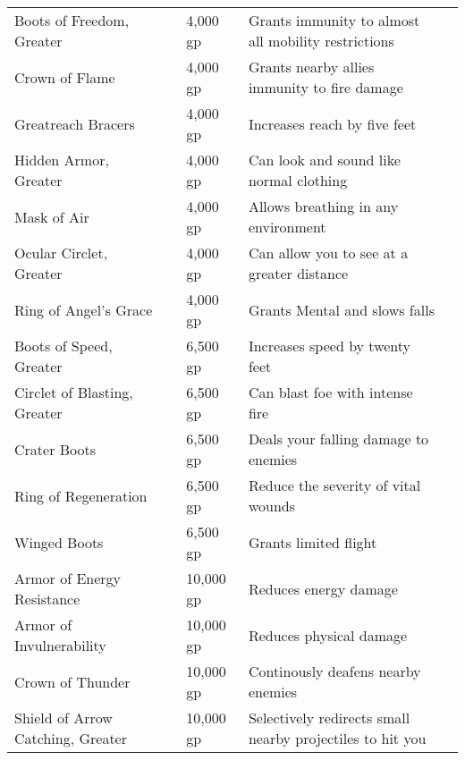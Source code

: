 \begin{longtabuwrapper}
\begin{longtabu}{l l l X l}
Boots of Freedom, Greater &  & 4,000 gp & Grants immunity to almost all mobility restrictions & \pageref{item:Boots of Freedom, Greater} \\
Crown of Flame &  & 4,000 gp & Grants nearby allies immunity to fire damage & \pageref{item:Crown of Flame} \\
Greatreach Bracers &  & 4,000 gp & Increases reach by five feet & \pageref{item:Greatreach Bracers} \\
Hidden Armor, Greater &  & 4,000 gp & Can look and sound like normal clothing & \pageref{item:Hidden Armor, Greater} \\
Mask of Air &  & 4,000 gp & Allows breathing in any environment & \pageref{item:Mask of Air} \\
Ocular Circlet, Greater &  & 4,000 gp & Can allow you to see at a greater distance & \pageref{item:Ocular Circlet, Greater} \\
Ring of Angel's Grace &  & 4,000 gp & Grants  Mental and slows falls & \pageref{item:Ring of Angel's Grace} \\
Boots of Speed, Greater &  & 6,500 gp & Increases speed by twenty feet & \pageref{item:Boots of Speed, Greater} \\
Circlet of Blasting, Greater &  & 6,500 gp & Can blast foe with intense fire & \pageref{item:Circlet of Blasting, Greater} \\
Crater Boots &  & 6,500 gp & Deals your falling damage to enemies & \pageref{item:Crater Boots} \\
Ring of Regeneration &  & 6,500 gp & Reduce the severity of vital wounds & \pageref{item:Ring of Regeneration} \\
Winged Boots &  & 6,500 gp & Grants limited flight & \pageref{item:Winged Boots} \\
Armor of Energy Resistance &  & 10,000 gp & Reduces energy damage & \pageref{item:Armor of Energy Resistance} \\
Armor of Invulnerability &  & 10,000 gp & Reduces physical damage & \pageref{item:Armor of Invulnerability} \\
Crown of Thunder &  & 10,000 gp & Continously deafens nearby enemies & \pageref{item:Crown of Thunder} \\
Shield of Arrow Catching, Greater &  & 10,000 gp & Selectively redirects small nearby projectiles to hit you & \pageref{item:Shield of Arrow Catching, Greater} \\

\end{longtabu}
\end{longtabuwrapper}
